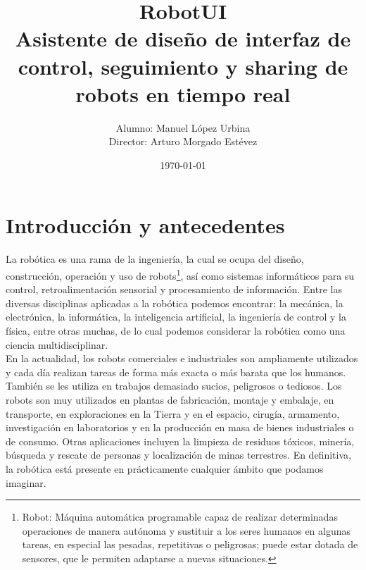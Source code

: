 \documentclass[a4paper,12pt]{article}
\title{RobotUI\\ Asistente de diseño de interfaz de control, seguimiento y sharing de robots en tiempo real }
\author{Alumno: Manuel López Urbina\\Director: Arturo Morgado Estévez}
\date{\today}
\begin{document}


\maketitle
\pagestyle{empty}
\tableofcontents 

\cleardoublepage
\pagestyle{plain}

\section{Introducción y antecedentes}

La robótica es una rama de la ingeniería, la cual se ocupa del diseño, construcción, operación y uso de robots\footnote{Robot: Máquina automática programable capaz de 
realizar determinadas operaciones de manera autónoma y sustituir a los seres humanos en algunas tareas, en especial las pesadas, repetitivas o peligrosas; puede estar dotada de sensores, 
que le permiten adaptarse a nuevas situaciones.}, así como sistemas informáticos para su control, retroalimentación sensorial y procesamiento de información. Entre las diversas disciplinas aplicadas
a la robótica podemos encontrar: la mecánica, la electrónica, la informática, la inteligencia artificial, la ingeniería de control y la física, entre otras muchas, de lo cual podemos considerar 
la robótica como una ciencia multidisciplinar.\\

En la actualidad, los robots comerciales e industriales son ampliamente utilizados y cada día realizan tareas de forma más exacta o más barata que los humanos. También se les utiliza en trabajos demasiado sucios,
peligrosos o tediosos. Los robots son muy utilizados en plantas de fabricación, montaje y embalaje, en transporte, en exploraciones en la Tierra y en el espacio, cirugía, armamento, investigación en laboratorios y 
en la producción en masa de bienes industriales o de consumo. Otras aplicaciones incluyen la limpieza de residuos tóxicos, minería, búsqueda y rescate de personas y localización de minas terrestres. En definitiva, 
la robótica está presente en prácticamente cualquier ámbito que podamos imaginar.\\
\end{document}
